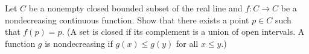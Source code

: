 \documentclass{article}
\begin{document}
\setlength{\parindent}{0pt}
Let $C$ be a nonempty closed bounded subset of the real line and $f:C\to C$ be a nondecreasing continuous function. Show that there exists a point $p\in C$ such that $f(p)=p$.\newline
(A set is closed if its complement is a union of open intervals. A function $g$ is nondecreasing if $g(x)\le g(y)$ for all $x\le y$.)
\end{document}
